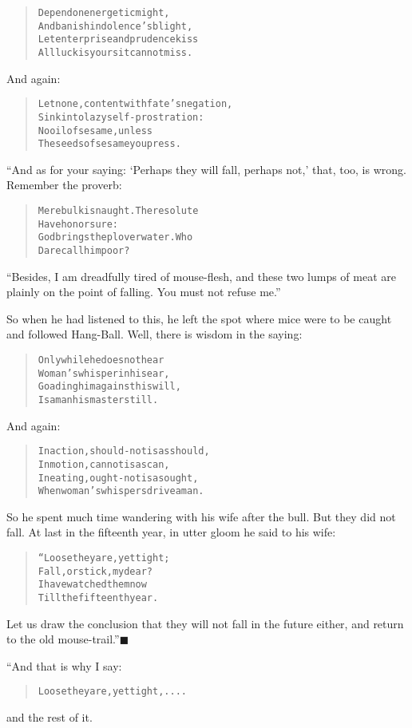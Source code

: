 \documentclass[article, twoside, 14pt]{memoir}
\newcommand{\qed}{\hfill \ensuremath{\blacksquare}}
\renewenvironment{verbatim}{%
\begin{quote}%
\vskip -10pt%
\begin{alltt}\normalfont\large}{\end{alltt}%
\end{quote}%
\vskip -10pt
} %
\begin{document}
\begin{verbatim}
Depend on energetic might,
And banish indolence's blight,
Let enterprise and prudence kiss{\textemdash}
All luck is yours{\textemdash}it cannot miss.
\end{verbatim}
And again:

\begin{verbatim}
Let none, content with fate's negation,
Sink into lazy self-prostration:
No oil of sesame, unless
The seeds of sesame you press.
\end{verbatim}
“And as for your saying: `Perhaps they will fall, perhaps not,'
that, too, is wrong. Remember the proverb:

\begin{verbatim}
Mere bulk is naught. The resolute
    Have honor sure:
God brings the plover water. Who
    Dare call him poor?
\end{verbatim}
``Besides, I am dreadfully tired of mouse-flesh, and these two lumps of meat are plainly on the point of falling. You must not refuse me.''

So when he had listened to this, he left the spot where mice were
to be caught and followed Hang-Ball. Well, there is wisdom in the
saying:

\begin{verbatim}
Only while he does not hear
Woman's whisper in his ear,
Goading him against his will,
Is a man his master still.
\end{verbatim}
And again:

\begin{verbatim}
In action, should-not is as should,
    In motion, cannot is as can,
In eating, ought-not is as ought,
    When woman's whispers drive a man.
\end{verbatim}
So he spent much time wandering with his wife after the bull. But
they did not fall. At last in the fifteenth year, in utter gloom he
said to his wife:

\begin{verbatim}
“Loose they are, yet tight;
    Fall, or stick, my dear?
I have watched them now
    Till the fifteenth year.
\end{verbatim}
Let us draw the conclusion that they will not fall in the future
either, and return to the old mouse-trail.”\hyperref[s43]{\qed}

“And that is why I say:

\begin{verbatim}
Loose they are, yet tight, ....
\end{verbatim}
and the rest of it.
\end{document}
